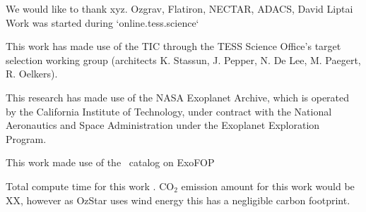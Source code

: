 \documentclass[linenumbers,floatfix,ApJL,twocolumn]{aastex631}
\begin{document}
\begin{acknowledgments}

We would like to thank xyz. 
Ozgrav, Flatiron, NECTAR, ADACS, David Liptai
Work was started during `online.tess.science`

This work has made use of the TIC through the TESS Science Office’s target selection working group (architects K. Stassun, J. Pepper, N. De Lee, M. Paegert, R. Oelkers).

This research has made use of the NASA Exoplanet Archive, which is operated by the California Institute of Technology, under contract with the National Aeronautics and Space Administration under the Exoplanet Exploration Program.

This work made use of the \tess\ catalog on ExoFOP

Total compute time for this work \red{\cpuHrs} . CO$_2$ emission amount for this work would be XX, however as OzStar uses wind energy this has a negligible carbon footprint. 

\end{acknowledgments}

\vspace{5mm}



{}

\end{document}
